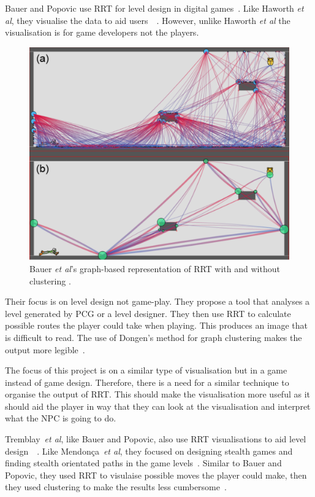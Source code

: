\documentclass[journal]{IEEEtran}
\begin{document}
Bauer and Popovic use RRT for level design in digital games~\cite{bauer2012}. Like Haworth \textit{et al}, they visualise the data to aid users~\cite{bauer2012}~\cite{Haworth2010}. However, unlike Haworth \textit{et al} the visualisation is for game developers not the players. 

\begin{figure}[h]
	\includegraphics[width=1.0\linewidth]{BauerRRT.png}
	\caption{ Bauer \textit{et al}'s graph-based representation of RRT with and without clustering \cite{bauer2012}.}
	\label{BauerRRT}
\end{figure} 

Their focus is on level design not game-play. They propose a tool that analyses a level generated by PCG or a level designer. They then use RRT to calculate possible routes the player could take when playing.  
This produces an image that is difficult to read. The use of Dongen's method for graph clustering makes the output more legible~\cite{bauer2012, van2001}.  

The focus of this project is on a similar type of  visualisation but in a game instead of game design. Therefore, there is a need for a similar technique to organise the output of RRT.  This should make the visualisation  more useful as it should aid the player in way that they can look at the visualisation and interpret what the NPC is going to do. 


Tremblay~\textit{et al}, like Bauer and Popovic, also use RRT visualisations to aid level design~\cite{Tremblay2013}~\cite{bauer2012}. Like Mendonça~\textit{et al}, they focused on designing stealth games and finding stealth orientated paths in the game levels~\cite{Mendonça2015}. Similar to Bauer and Popovic, they used RRT to visulaise possible moves the player could make, then they used clustering to make the results less cumbersome~\cite{Tremblay2013}. 
\end{document}
